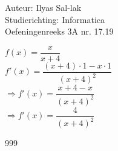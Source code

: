 \documentclass[a4paper]{article}
\begin{document}
\noindent \large Auteur: Ilyas Sal-lak \\
\noindent \large Studierichting: Informatica\\
\noindent \large Oefeningenreeks 3A nr. 17.19\\

\medskip

\normalsize

$f(x) = \dfrac{x}{x + 4}$ \\

$f'(x) = \dfrac{(x + 4) \cdot 1 - x \cdot 1}{(x + 4)^2}$ \\

$\Rightarrow f'(x) = \dfrac{x + 4 - x}{(x + 4)^2}$ \\

$\Rightarrow f'(x) = \dfrac{4}{(x + 4)^2}$

\begin{thebibliography}{999}
\end{thebibliography}
\end{document}
